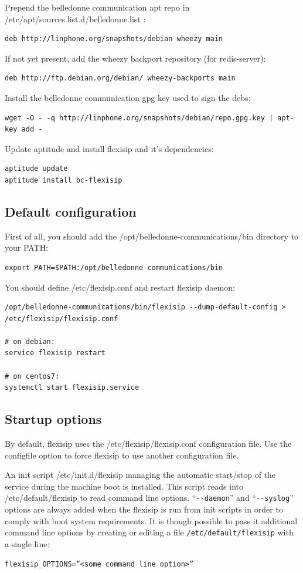\documentclass[a4paper,10pt]{article}
\begin{document}
Prepend the belledonne communication apt repo in /etc/apt/sources.list.d/belledonne.list :
\begin{verbatim}
deb http://linphone.org/snapshots/debian wheezy main
\end{verbatim}

If not yet present, add the wheezy backport repository (for redis-server):
\begin{verbatim}
deb http://ftp.debian.org/debian/ wheezy-backports main
\end{verbatim} 

Install the belledonne communication gpg key used to sign the debs:
\begin{verbatim}
wget -O - -q http://linphone.org/snapshots/debian/repo.gpg.key | apt-key add -
\end{verbatim}

Update aptitude and install flexisip and it's dependencies:
\begin{verbatim}
aptitude update
aptitude install bc-flexisip
\end{verbatim}

\subsection{Default configuration}

First of all, you should add the /opt/belledonne-communications/bin directory to your PATH:

\begin{verbatim}
export PATH=$PATH:/opt/belledonne-communications/bin
\end{verbatim}

You should define /etc/flexisip.conf and restart flexisip daemon:
\begin{verbatim}
/opt/belledonne-communications/bin/flexisip --dump-default-config > /etc/flexisip/flexisip.conf

# on debian:
service flexisip restart

# on centos7:
systemctl start flexisip.service
\end{verbatim}

\subsection{Startup options}
By default, flexisip uses the /etc/flexisip/flexisip.conf configuration file.
Use the configfile option to force flexisip to use another configuration file.

An init script /etc/init.d/flexisip managing the automatic start/stop of the service during the machine boot is installed.
This script reads into /etc/default/flexisip to read command line options. “\verb|--daemon|” and “\verb|--syslog|” options are always added when the flexisip is run from init scripts in order to comply with boot system requirements.
It is though possible to pass it additional command line options by creating or editing a file \verb|/etc/default/flexisip| with a single line:
\begin{verbatim}
flexisip_OPTIONS=”<some command line option>” 
\end{verbatim}
\end{document}
